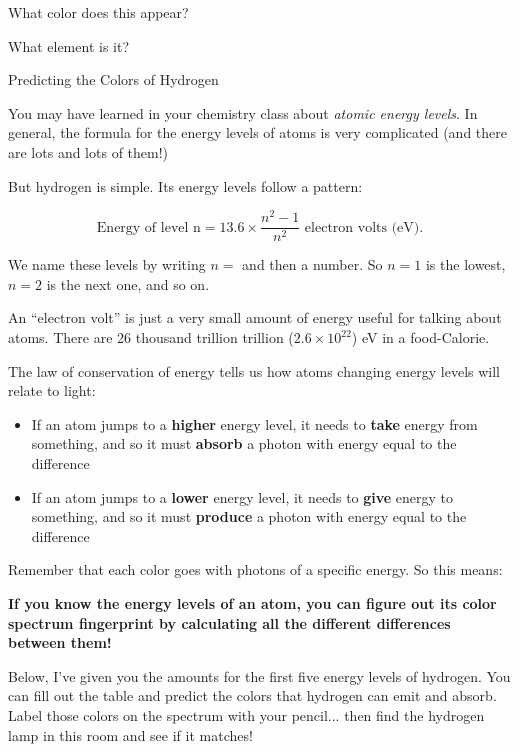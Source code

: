 \documentclass[12pt]{article}
\begin{document}
\begin{minipage}{0.5\textwidth}
What color does this appear?
\end{minipage}
\begin{minipage}{0.5\textwidth}
What element is it?
\end{minipage}

\newpage
\begin{landscape}

\begin{center}
\Large 
Predicting the Colors of Hydrogen
\end{center}

\large 
You may have learned in your chemistry class about {\it atomic energy levels}. In general, the formula for the energy levels of atoms is very complicated (and there are lots and lots of them!)

But hydrogen is simple. Its energy levels follow a pattern:

$$\text{Energy of level n} = 13.6 \times \frac{n^2-1}{n^2} \text{ electron volts (eV)}.$$

We name these levels by writing $n=$ and then a number. So $n=1$ is the lowest, $n=2$ is the next one, and so on.

An ``electron volt'' is just a very small amount of energy useful for talking about atoms. There are 26 thousand trillion trillion ($2.6 \times 10^{22}$) eV in a food-Calorie.

The law of conservation of energy tells us how atoms changing energy levels will relate to light:


\begin{itemize}
\item If an atom jumps to a {\bf higher} energy level, it needs to {\bf take} energy from something, and so it must  {\bf absorb} a photon with energy equal to the difference
\item If an atom jumps to a {\bf lower} energy level, it needs to {\bf give} energy to something, and so it must {\bf produce} a photon with energy equal to the difference
\end{itemize}

Remember that each color goes with photons of a specific energy. So this means:

{\bf If you know the energy levels of an atom, you can figure out its color spectrum fingerprint by calculating all 
the different differences between them!}

\newpage
Below, I've given you the amounts for the first five energy levels of hydrogen. You can fill out the table and predict the colors that hydrogen can emit and absorb. Label those colors on the spectrum with your pencil... then find the hydrogen lamp in this room
and see if it matches!


\end{landscape}
\end{document}
